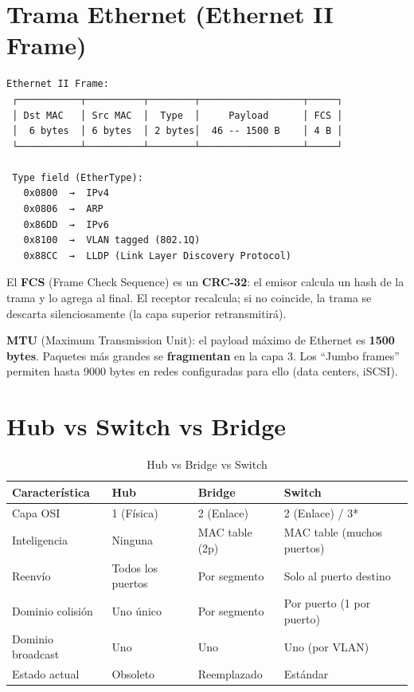 \section{ Trama Ethernet (Ethernet II Frame)}

\begin{lstlisting}
Ethernet II Frame:
 ┌───────────┬──────────┬────────┬──────────────────┬─────┐
 │ Dst MAC   │ Src MAC  │  Type  │     Payload      │ FCS │
 │  6 bytes  │ 6 bytes  │ 2 bytes│  46 -- 1500 B    │ 4 B │
 └───────────┴──────────┴────────┴──────────────────┴─────┘

 Type field (EtherType):
   0x0800  →  IPv4
   0x0806  →  ARP
   0x86DD  →  IPv6
   0x8100  →  VLAN tagged (802.1Q)
   0x88CC  →  LLDP (Link Layer Discovery Protocol)
\end{lstlisting}

El \textbf{FCS} (Frame Check Sequence) es un \textbf{CRC-32}: el emisor calcula
un hash de la trama y lo agrega al final. El receptor recalcula; si no coincide,
la trama se descarta silenciosamente (la capa superior retransmitirá).

\textbf{MTU} (Maximum Transmission Unit): el payload máximo de Ethernet es
\textbf{1500 bytes}. Paquetes más grandes se \textbf{fragmentan} en la capa 3.
Los ``Jumbo frames'' permiten hasta 9000 bytes en redes configuradas para ello
(data centers, iSCSI).

\section{ Hub vs Switch vs Bridge}

\begin{table}[h!]
\centering
\renewcommand{\arraystretch}{1.4}
\begin{tabular}{llll}
\toprule
\textbf{Característica} & \textbf{Hub} & \textbf{Bridge} & \textbf{Switch} \\
\midrule
Capa OSI        & 1 (Física)     & 2 (Enlace)     & 2 (Enlace) / 3* \\
Inteligencia    & Ninguna        & MAC table (2p) & MAC table (muchos puertos) \\
Reenvío         & Todos los puertos & Por segmento & Solo al puerto destino \\
Dominio colisión & Uno único     & Por segmento   & Por puerto (1 por puerto) \\
Dominio broadcast & Uno          & Uno            & Uno (por VLAN) \\
Estado actual   & Obsoleto       & Reemplazado    & Estándar \\
\bottomrule
\end{tabular}
\caption{Hub vs Bridge vs Switch}
\end{table}

